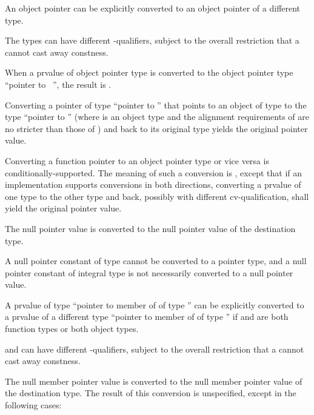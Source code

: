 \pnum
An object pointer
can be explicitly converted to an object pointer of a different type.
\begin{footnote}
The
types can have different \cv-qualifiers, subject to
the overall
restriction that a  cannot cast away constness.
\end{footnote}
When a prvalue  of object pointer type is converted to
the object pointer type ``pointer to \cv{}~'', the result is .
\begin{note}
Converting a pointer of type ``pointer to ''
that points to an object of type 
to the type ``pointer to ''
(where  is an object type
and the alignment requirements of 
are no stricter than those of )
and back to its original type yields the original pointer value.
\end{note}

\pnum
Converting a function pointer to an object pointer
type or vice versa is
conditionally-supported. The meaning of such a conversion is
,
except that if an implementation
supports conversions in both directions, converting a prvalue of one type to the other
type and back, possibly with different cv-qualification, shall yield the original
pointer value.

\pnum
The null pointer value is converted to the null pointer value
of the destination type.
\begin{note}
A null pointer constant of type  cannot be converted to a
pointer type, and a null pointer constant of integral type is not necessarily
converted to a null pointer value.
\end{note}

\pnum
{}%
%
A prvalue of type ``pointer to member of  of type ''
can be explicitly converted to a prvalue of a different type ``pointer to member of
 of type '' if  and  are both
function types or both object types.
\begin{footnote}
 and  can have
different \cv-qualifiers, subject to
the overall restriction that a  cannot cast away
constness.
\end{footnote}
The null member pointer value is converted to the
null member pointer value of the destination type. The result of this
conversion is unspecified, except in the following cases:

